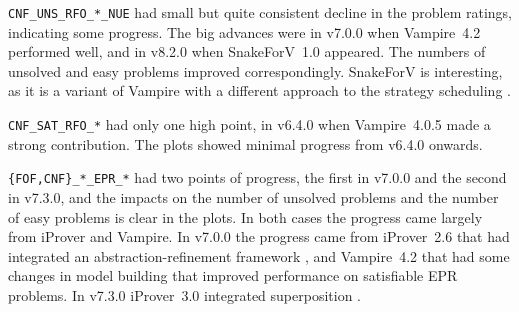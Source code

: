 \documentclass[runningheads]{llncs}
\begin{document}
{\tt CNF\_UNS\_RFO\_*\_NUE} had small but quite consistent decline in the problem ratings, 
indicating some progress.
The big advances were in v7.0.0 when Vampire~4.2 performed well, and in v8.2.0 when SnakeForV~1.0
appeared.
The numbers of unsolved and easy problems improved correspondingly.
SnakeForV is interesting, as it is a variant of Vampire with a different approach to the strategy
scheduling \cite{Sud22}.

{\tt CNF\_SAT\_RFO\_*} had only one high point, in v6.4.0 when Vampire~4.0.5 made a strong
contribution.
The plots showed minimal progress from v6.4.0 onwards.

{\tt \{FOF,CNF\}\_*\_EPR\_*} had two points of progress, the first in v7.0.0 and the second in
v7.3.0, and the impacts on the number of unsolved problems and the number of easy problems is
clear in the plots.
In both cases the progress came largely from iProver and Vampire.
In v7.0.0 the progress came from iProver~2.6 that had integrated an abstraction-refinement 
framework \cite{HK17}, and Vampire~4.2 that had some changes in model building that improved 
performance on satisfiable EPR problems.
In v7.3.0 iProver~3.0 integrated superposition \cite{DK20}.
\end{document}
